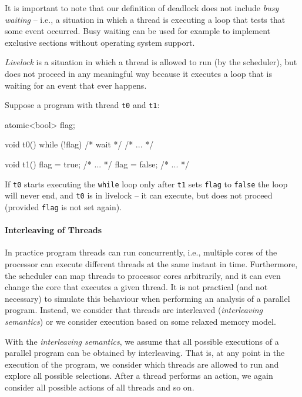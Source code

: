 It is important to note that our definition of deadlock does not include
\emph{busy waiting} -- i.e., a situation in which a thread is executing a loop
that tests that some event occurred.
Busy waiting can be used for example to implement exclusive sections without
operating system support.

\begin{definition}[Livelock]\label{def:livelock}
    \emph{Livelock} is a situation in which a thread is allowed to run (by
    the scheduler), but does not proceed in any meaningful way because it
    executes a loop that is waiting for an event that ever happens.%
    \begin{marginnote}
      Suppose a program with thread \texttt{t0} and \texttt{t1}:

      \medskip
      \begin{cppcode}
        atomic<bool> flag;

        void t0() {
          while (!flag) {
            /* wait */
          }
          /* ... */
        }

        void t1() {
          flag = true;
          /* ... */
          flag = false;
          /* ... */
        }
      \end{cppcode}
      \smallskip

      If \texttt{t0} starts executing the \texttt{while} loop only after \texttt{t1} sets \texttt{flag} to \texttt{false} the loop will never end, and \texttt{t0} is in livelock -- it can execute, but does not proceed (provided \texttt{flag} is not set again).
    \end{marginnote}
\end{definition}

\paragraph{Interleaving of Threads}

In practice program threads can run concurrently, i.e., multiple cores of the
processor can execute different threads at the same instant in time.
Furthermore, the scheduler can map threads to processor cores arbitrarily, and
it can even change the core that executes a given thread.
It is not practical (and not necessary) to simulate this behaviour when
performing an analysis of a parallel program.
Instead, we consider that threads are interleaved (\emph{interleaving
semantics}) or we consider execution based on some relaxed memory model.

\begin{definition}
    With the \emph{interleaving semantics}, we assume that all possible
    executions of a parallel program can be obtained by interleaving.
    That is, at any point in the execution of the program, we consider which
    threads are allowed to run and explore all possible selections.
    After a thread performs an action, we again consider all possible actions
    of all threads and so on.
\end{definition}




